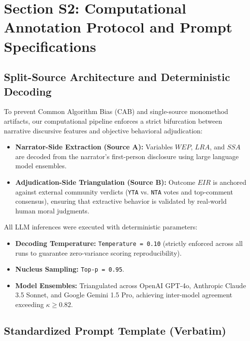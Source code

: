 \documentclass[11pt,a4paper]{article}
\begin{document}
\newpage
\section{Section S2: Computational Annotation Protocol and Prompt Specifications}
\label{sec:supp_prompt}

\subsection{Split-Source Architecture and Deterministic Decoding}
To prevent Common Algorithm Bias (CAB) and single-source monomethod artifacts, our computational pipeline enforces a strict bifurcation between narrative discursive features and objective behavioral adjudication:
\begin{itemize}
    \item \textbf{Narrator-Side Extraction (Source A):} Variables $WEP$, $LRA$, and $SSA$ are decoded from the narrator's first-person disclosure using large language model ensembles.
    \item \textbf{Adjudication-Side Triangulation (Source B):} Outcome $EIR$ is anchored against external community verdicts (\texttt{YTA} vs. \texttt{NTA} votes and top-comment consensus), ensuring that extractive behavior is validated by real-world human moral judgments.
\end{itemize}

All LLM inferences were executed with deterministic parameters:
\begin{itemize}
    \item \textbf{Decoding Temperature:} \texttt{Temperature = 0.10} (strictly enforced across all runs to guarantee zero-variance scoring reproducibility).
    \item \textbf{Nucleus Sampling:} \texttt{Top-p = 0.95}.
    \item \textbf{Model Ensembles:} Triangulated across OpenAI GPT-4o, Anthropic Claude 3.5 Sonnet, and Google Gemini 1.5 Pro, achieving inter-model agreement exceeding $\kappa \ge 0.82$.
\end{itemize}

\subsection{Standardized Prompt Template (Verbatim)}
\end{document}

